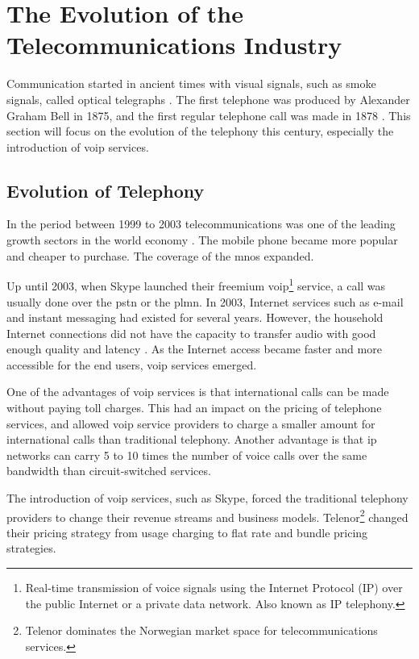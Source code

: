 \section{The Evolution of the Telecommunications Industry}
Communication started in ancient times with visual signals, such as smoke signals, called optical telegraphs \cite{itu50years}. The first telephone was produced by Alexander Graham Bell in 1875, and the first regular telephone call was made in 1878 \cite{hallock2004brief}. This section will focus on the evolution of the telephony this century, especially the introduction of \gls{voip} services. 


\subsection{Evolution of Telephony}
In the period between 1999 to 2003 telecommunications was one of the leading growth sectors in the world economy \cite{itu50years}. The mobile phone became more popular and cheaper to purchase. The coverage of the \glspl{mno} expanded.

Up until 2003, when Skype launched their freemium \gls{voip}\footnote{Real-time transmission of voice signals using 
the Internet Protocol (IP) over the public Internet or a private data network. Also known as IP telephony.} service, a call was usually done over the \gls{pstn} or the \gls{plmn}. In 2003, Internet services such as e-mail and instant messaging had existed for several years. However, the household Internet connections did not have the capacity to transfer audio with good enough quality and latency \cite{thomasbruun}. As the Internet access became faster and more accessible for the end users, \gls{voip} services emerged. 

One of the advantages of \gls{voip} services is that international calls can be made without paying toll charges. This had an impact on the pricing of telephone services, and allowed \gls{voip} service providers to charge a smaller amount for international calls than traditional telephony. Another advantage is that \gls{ip} networks can carry 5 to 10 times the number of voice calls over the same bandwidth than circuit-switched services. 

The introduction of \gls{voip} services, such as Skype, forced the traditional telephony providers to change their revenue streams and business models. Telenor\footnote{Telenor dominates the Norwegian market space for telecommunications services.} changed their pricing strategy from usage charging to flat rate and bundle pricing strategies. 



